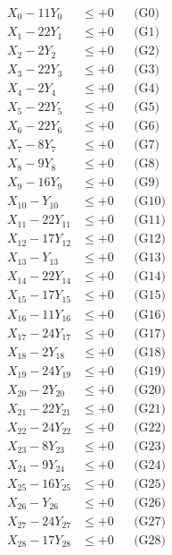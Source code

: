 \documentclass[a4paper,10pt]{article}
\begin{document}
\allowdisplaybreaks
{\small
\begin{align}
\allowbreak
\allowbreak
\allowbreak
X_{0} - 11Y_{0} &\leq +0 && \text{(G0)} \\
X_{1} - 22Y_{1} &\leq +0 && \text{(G1)} \\
X_{2} - 2Y_{2} &\leq +0 && \text{(G2)} \\
X_{3} - 22Y_{3} &\leq +0 && \text{(G3)} \\
X_{4} - 2Y_{4} &\leq +0 && \text{(G4)} \\
X_{5} - 22Y_{5} &\leq +0 && \text{(G5)} \\
X_{6} - 22Y_{6} &\leq +0 && \text{(G6)} \\
X_{7} - 8Y_{7} &\leq +0 && \text{(G7)} \\
\allowbreak
X_{8} - 9Y_{8} &\leq +0 && \text{(G8)} \\
X_{9} - 16Y_{9} &\leq +0 && \text{(G9)} \\
X_{10} - Y_{10} &\leq +0 && \text{(G10)} \\
X_{11} - 22Y_{11} &\leq +0 && \text{(G11)} \\
X_{12} - 17Y_{12} &\leq +0 && \text{(G12)} \\
X_{13} - Y_{13} &\leq +0 && \text{(G13)} \\
X_{14} - 22Y_{14} &\leq +0 && \text{(G14)} \\
X_{15} - 17Y_{15} &\leq +0 && \text{(G15)} \\
X_{16} - 11Y_{16} &\leq +0 && \text{(G16)} \\
X_{17} - 24Y_{17} &\leq +0 && \text{(G17)} \\
\allowbreak
X_{18} - 2Y_{18} &\leq +0 && \text{(G18)} \\
X_{19} - 24Y_{19} &\leq +0 && \text{(G19)} \\
X_{20} - 2Y_{20} &\leq +0 && \text{(G20)} \\
X_{21} - 22Y_{21} &\leq +0 && \text{(G21)} \\
X_{22} - 24Y_{22} &\leq +0 && \text{(G22)} \\
X_{23} - 8Y_{23} &\leq +0 && \text{(G23)} \\
X_{24} - 9Y_{24} &\leq +0 && \text{(G24)} \\
X_{25} - 16Y_{25} &\leq +0 && \text{(G25)} \\
X_{26} - Y_{26} &\leq +0 && \text{(G26)} \\
X_{27} - 24Y_{27} &\leq +0 && \text{(G27)} \\
\allowbreak
X_{28} - 17Y_{28} &\leq +0 && \text{(G28)} \\

\end{align}}
\end{document}
